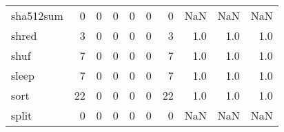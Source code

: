 \begin{longtable}{lrrrrrrrrr}
sha512sum &                                                  0 &                                                  0 &                                                  0 &                                                  0 &                                                  0 &                                                  0 &                                                NaN &                                    NaN &                                  NaN \\
shred     &                                                  3 &                                                  0 &                                                  0 &                                                  0 &                                                  0 &                                                  3 &                                                1.0 &                                    1.0 &                                  1.0 \\
shuf      &                                                  7 &                                                  0 &                                                  0 &                                                  0 &                                                  0 &                                                  7 &                                                1.0 &                                    1.0 &                                  1.0 \\
sleep     &                                                  7 &                                                  0 &                                                  0 &                                                  0 &                                                  0 &                                                  7 &                                                1.0 &                                    1.0 &                                  1.0 \\
sort      &                                                 22 &                                                  0 &                                                  0 &                                                  0 &                                                  0 &                                                 22 &                                                1.0 &                                    1.0 &                                  1.0 \\
split     &                                                  0 &                                                  0 &                                                  0 &                                                  0 &                                                  0 &                                                  0 &                                                NaN &                                    NaN &                                  NaN \\

\end{longtable}
